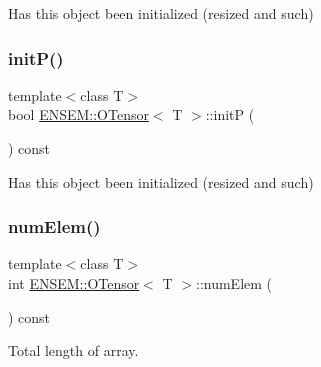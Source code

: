 Has this object been initialized (resized and such) 

\mbox{\label{classENSEM_1_1OTensor_a3f591732bdd0b358cde1069b21fbf1f5}} 
\subsubsection{\texorpdfstring{initP()}{initP()}\hspace{0.1cm}{\footnotesize\ttfamily [3/3]}}
{\footnotesize\ttfamily template$<$class T$>$ \\
bool \mbox{\hyperlink{classENSEM_1_1OTensor}{E\+N\+S\+E\+M\+::\+O\+Tensor}}$<$ T $>$\+::initP (\begin{DoxyParamCaption}{ }\end{DoxyParamCaption}) const\hspace{0.3cm}{\ttfamily [inline]}}



Has this object been initialized (resized and such) 

\mbox{\label{classENSEM_1_1OTensor_a30a241a5b4f16fab55fd70ffee52828a}} 
\subsubsection{\texorpdfstring{numElem()}{numElem()}\hspace{0.1cm}{\footnotesize\ttfamily [1/3]}}
{\footnotesize\ttfamily template$<$class T$>$ \\
int \mbox{\hyperlink{classENSEM_1_1OTensor}{E\+N\+S\+E\+M\+::\+O\+Tensor}}$<$ T $>$\+::num\+Elem (\begin{DoxyParamCaption}{ }\end{DoxyParamCaption}) const\hspace{0.3cm}{\ttfamily [inline]}}



Total length of array. 

\mbox{\label{classENSEM_1_1OTensor_a30a241a5b4f16fab55fd70ffee52828a}} 

